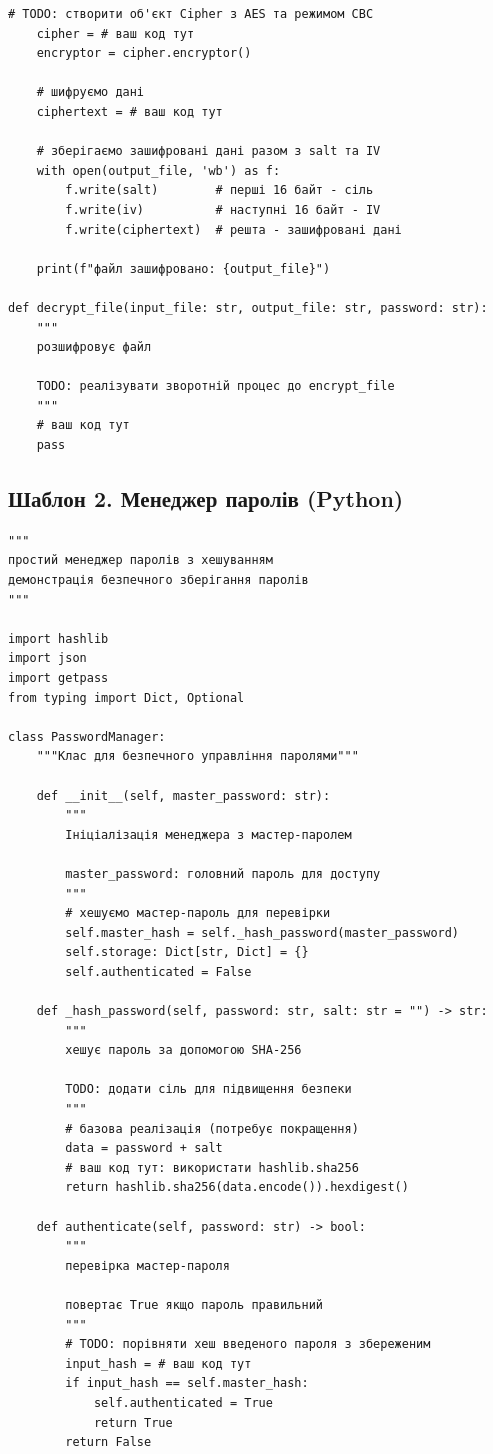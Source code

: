 \begin{lstlisting}[caption={Шаблон для симетричного шифрування файлів}]
    # TODO: створити об'єкт Cipher з AES та режимом CBC
    cipher = # ваш код тут
    encryptor = cipher.encryptor()
    
    # шифруємо дані
    ciphertext = # ваш код тут
    
    # зберігаємо зашифровані дані разом з salt та IV
    with open(output_file, 'wb') as f:
        f.write(salt)        # перші 16 байт - сіль
        f.write(iv)          # наступні 16 байт - IV
        f.write(ciphertext)  # решта - зашифровані дані
    
    print(f"файл зашифровано: {output_file}")

def decrypt_file(input_file: str, output_file: str, password: str):
    """
    розшифровує файл
    
    TODO: реалізувати зворотній процес до encrypt_file
    """
    # ваш код тут
    pass
\end{lstlisting}

\subsection*{Шаблон 2. Менеджер паролів (Python)}

\begin{lstlisting}[caption={Простий менеджер паролів з хешуванням}]
"""
простий менеджер паролів з хешуванням
демонстрація безпечного зберігання паролів
"""

import hashlib
import json
import getpass
from typing import Dict, Optional

class PasswordManager:
    """Kлас для безпечного управління паролями"""
    
    def __init__(self, master_password: str):
        """
        Iніціалізація менеджера з мастер-паролем
        
        master_password: головний пароль для доступу
        """
        # хешуємо мастер-пароль для перевірки
        self.master_hash = self._hash_password(master_password)
        self.storage: Dict[str, Dict] = {}
        self.authenticated = False
    
    def _hash_password(self, password: str, salt: str = "") -> str:
        """
        хешує пароль за допомогою SHA-256
        
        TODO: додати сіль для підвищення безпеки
        """
        # базова реалізація (потребує покращення)
        data = password + salt
        # ваш код тут: використати hashlib.sha256
        return hashlib.sha256(data.encode()).hexdigest()
    
    def authenticate(self, password: str) -> bool:
        """
        перевірка мастер-пароля
        
        повертає True якщо пароль правильний
        """
        # TODO: порівняти хеш введеного пароля з збереженим
        input_hash = # ваш код тут
        if input_hash == self.master_hash:
            self.authenticated = True
            return True
        return False
\end{lstlisting}

